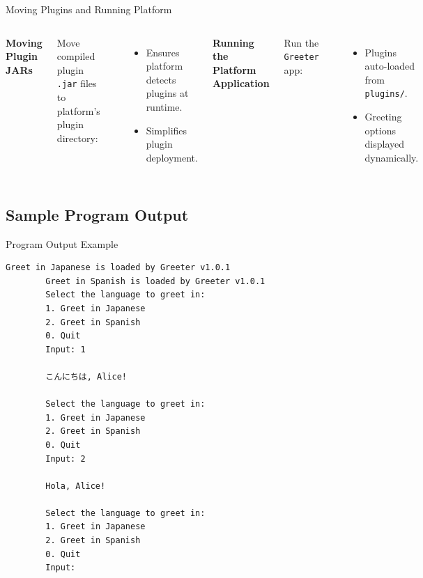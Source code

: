 \documentclass[aspectratio=169, table]{beamer}
\begin{document}
\begin{frame}[fragile]{Moving Plugins and Running Platform}
	\vspace{20pt}
	\begin{columns}[t]
		\textbf{Moving Plugin JARs}
		
		Move compiled plugin \texttt{.jar} files to platform’s plugin directory:
		
		\begin{lstlisting}[language=bash, basicstyle=\footnotesize\ttfamily]
			mv target/*.jar ../platform/plugins/
		\end{lstlisting}
		
		\begin{itemize}
			\item Ensures platform detects plugins at runtime.
			\item Simplifies plugin deployment.
		\end{itemize}
		
		\textbf{Running the Platform Application}
		
		Run the \texttt{Greeter} app:
		
		\begin{lstlisting}[language=bash, basicstyle=\footnotesize\ttfamily]
			mvn run 
			# or
			java -jar target/platform.jar
		\end{lstlisting}
		
		\begin{itemize}
			\item Plugins auto-loaded from \texttt{plugins/}.
			\item Greeting options displayed dynamically.
		\end{itemize}
	\end{columns}
\end{frame}


\subsection{Sample Program Output}

\begin{frame}[fragile]{Program Output Example}
	\vspace{20pt}
	\begin{lstlisting}[language=bash, basicstyle=\tiny\ttfamily]
		Greet in Japanese is loaded by Greeter v1.0.1
		Greet in Spanish is loaded by Greeter v1.0.1
		Select the language to greet in:
		1. Greet in Japanese
		2. Greet in Spanish
		0. Quit
		Input: 1
		
		こんにちは, Alice!
		
		Select the language to greet in:
		1. Greet in Japanese
		2. Greet in Spanish
		0. Quit
		Input: 2
		
		Hola, Alice!
		
		Select the language to greet in:
		1. Greet in Japanese
		2. Greet in Spanish
		0. Quit
		Input:
	\end{lstlisting}
\end{frame}
\end{document}
